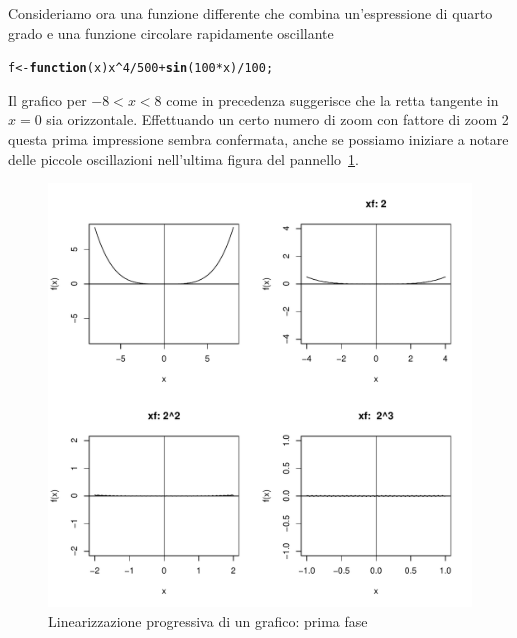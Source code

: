 \documentclass[onecolumn,11pt]{book}\usepackage[]{graphicx}\usepackage[]{color}
\makeatletter
\def\maxwidth{ %
  \ifdim\Gin@nat@width>\linewidth
    \linewidth
  \else
    \Gin@nat@width
  \fi
}
\newcommand{\hlnum}[1]{\textcolor[rgb]{0.686,0.059,0.569}{#1}}%
\newcommand{\hlopt}[1]{\textcolor[rgb]{0,0,0}{#1}}%
\newcommand{\hlstd}[1]{\textcolor[rgb]{0.345,0.345,0.345}{#1}}%
\newcommand{\hlkwa}[1]{\textcolor[rgb]{0.161,0.373,0.58}{\textbf{#1}}}%
\newcommand{\hlkwb}[1]{\textcolor[rgb]{0.69,0.353,0.396}{#1}}%
\newcommand{\hlkwc}[1]{\textcolor[rgb]{0.333,0.667,0.333}{#1}}%
\newcommand{\hlkwd}[1]{\textcolor[rgb]{0.737,0.353,0.396}{\textbf{#1}}}%
\newenvironment{kframe}{%
 \def\at@end@of@kframe{}%
 \ifinner\ifhmode%
  \def\at@end@of@kframe{\end{minipage}}%
  \begin{minipage}{\columnwidth}%
 \fi\fi%
 \def\FrameCommand##1{\hskip\@totalleftmargin \hskip-\fboxsep
 \colorbox{shadecolor}{##1}\hskip-\fboxsep
     \hskip-\linewidth \hskip-\@totalleftmargin \hskip\columnwidth}%
 \MakeFramed {\advance\hsize-\width
   \@totalleftmargin\z@ \linewidth\hsize
   \@setminipage}}%
 {\par\unskip\endMakeFramed%
 \at@end@of@kframe}
\newenvironment{knitrout}{}{} %
\makeatother
\begin{document}
Consideriamo ora una funzione differente che combina un'espressione di quarto grado e una funzione circolare rapidamente oscillante
\begin{knitrout}
\color{fgcolor}\begin{kframe}
\begin{alltt}
\hlstd{f}\hlkwb{<-}\hlkwa{function}\hlstd{(}\hlkwc{x}\hlstd{) x}\hlopt{^}\hlnum{4}\hlopt{/}\hlnum{500} \hlopt{+} \hlkwd{sin}\hlstd{(}\hlnum{100}\hlopt{*}\hlstd{x)}\hlopt{/}\hlnum{100}\hlstd{;}
\end{alltt}
\end{kframe}
\end{knitrout}
Il grafico per $-8<x<8$ come in precedenza  suggerisce che la  retta tangente  in $x=0$ sia orizzontale.
Effettuando un certo numero di zoom con fattore di zoom 2 questa prima impressione sembra confermata, anche se possiamo iniziare a notare delle piccole oscillazioni nell'ultima figura del pannello~\ref{fig:linear2}.
\begin{figure}
\begin{knitrout}
\color{fgcolor}
\includegraphics[width=\maxwidth]{figure/unnamed-chunk-113-1} 

\end{knitrout}
\caption{Linearizzazione progressiva di un grafico: prima fase}
\label{fig:linear2}
\end{figure}
\end{document}
